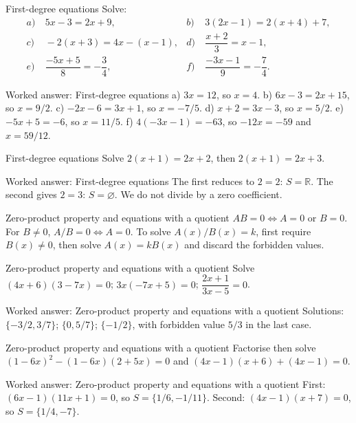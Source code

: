 \documentclass[aspectratio=169,10pt]{beamer}
\providecommand{\R}{\mathbb{R}}
\begin{document}
\begin{frame}{First-degree equations}
Solve:
\[\begin{aligned}
a)&\ 5x-3=2x+9,& b)&\ 3(2x-1)=2(x+4)+7,\\
c)&\ -2(x+3)=4x-(x-1),&d)&\ \dfrac{x+2}{3}=x-1,\\
e)&\ \dfrac{-5x+5}{8}=-\dfrac34,&f)&\ \dfrac{-3x-1}{9}=-\dfrac74.
\end{aligned}\]
\end{frame}
\begin{frame}{Worked answer: First-degree equations}
a) \(3x=12\), so \(x=4\). b) \(6x-3=2x+15\), so \(x=9/2\). c) \(-2x-6=3x+1\), so \(x=-7/5\). d) \(x+2=3x-3\), so \(x=5/2\). e) \(-5x+5=-6\), so \(x=11/5\). f) \(4(-3x-1)=-63\), so \(-12x=-59\) and \(x=59/12\).
\end{frame}
\begin{frame}{First-degree equations}
Solve \(2(x+1)=2x+2\), then \(2(x+1)=2x+3\).
\end{frame}
\begin{frame}{Worked answer: First-degree equations}
The first reduces to \(2=2\): \(S=\R\). The second gives \(2=3\): \(S=\varnothing\). We do not divide by a zero coefficient.
\end{frame}
\begin{frame}{Zero-product property and equations with a quotient}
\(AB=0\iff A=0\) or \(B=0\). For \(B\ne0\), \(A/B=0\iff A=0\). To solve \(A(x)/B(x)=k\), first require \(B(x)\ne0\), then solve \(A(x)=kB(x)\) and discard the forbidden values.
\end{frame}
\begin{frame}{Zero-product property and equations with a quotient}
Solve \((4x+6)(3-7x)=0\); \(3x(-7x+5)=0\); \(\dfrac{2x+1}{3x-5}=0\).
\end{frame}
\begin{frame}{Worked answer: Zero-product property and equations with a quotient}
Solutions: \(\{-3/2,3/7\}\); \(\{0,5/7\}\); \(\{-1/2\}\), with forbidden value \(5/3\) in the last case.
\end{frame}
\begin{frame}{Zero-product property and equations with a quotient}
Factorise then solve \((1-6x)^2-(1-6x)(2+5x)=0\) and \((4x-1)(x+6)+(4x-1)=0\).
\end{frame}
\begin{frame}{Worked answer: Zero-product property and equations with a quotient}
First: \((6x-1)(11x+1)=0\), so \(S=\{1/6,-1/11\}\). Second: \((4x-1)(x+7)=0\), so \(S=\{1/4,-7\}\).
\end{frame}
\end{document}
